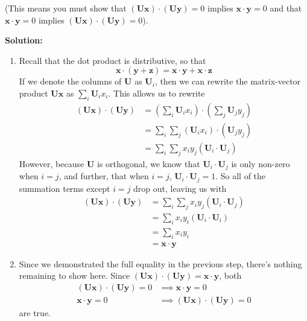 \documentclass[]{article}
\newcommand{\x}{\bm{x}}					%
\newcommand{\y}{\bm{y}}					%
\newcommand{\solution}{\vskip 0.5cm \textbf{\large Solution:} \\}
\begin{document}
\begin{enumerate}
\begin{enumerate}
		(This means you must show that $(\bm{Ux})\cdot(\bm{Uy}) = 0$ implies $\x\cdot \y=0$ and that $\x\cdot \y=0$ implies $(\bm{Ux})\cdot(\bm{Uy}) = 0$).
	  \end{enumerate}

	  \solution
	  \begin{enumerate}
	  \item Recall that the dot product is distributive, so that
        $$\x \cdot (\y + \bm{z}) = \x \cdot \y +
        \x \cdot \bm{z}$$ If we denote the columns of $\bm{U}$ as
        $\bm{U}_i$, then we can rewrite the matrix-vector product
        $\bm{U}\x$ as $\sum_{i} \bm{U}_i x_i$. This allows us to
        rewrite 
        \[\begin{split}
        (\bm{Ux})\cdot(\bm{Uy}) &= \left(\sum_{i} \bm{U}_i x_i\right) \cdot \left(\sum_{j} \bm{U}_j y_j\right) \\
        &= \sum_{i} \sum_{j} (\bm{U}_i x_i) \cdot (\bm{U}_j y_j) \\
        &= \sum_{i} \sum_{j} x_i y_j (\bm{U}_i \cdot \bm{U}_j)
        \end{split}\]
        However, because $\bm{U}$ is orthogonal, we know that
        $\bm{U}_i \cdot \bm{U}_j$ is only non-zero when $i = j$, and
        further, that when $i = j$, $\bm{U}_i \cdot \bm{U}_j = 1$. So
        all of the summation terms except $i = j$ drop out, leaving us
        with
        \[\begin{split}
        (\bm{Ux})\cdot(\bm{Uy}) &= \sum_{i} \sum_{j} x_i y_j (\bm{U}_i \cdot \bm{U}_j) \\
        &= \sum_{i} x_i y_i (\bm{U}_i \cdot \bm{U}_i) \\
        &= \sum_{i}  x_i y_i \\
        &= \x \cdot \y
        \end{split}\]

      \item Since we demonstrated the full equality in the previous
        step, there's nothing remaining to show here. Since
        $(\bm{Ux})\cdot(\bm{Uy}) = \x \cdot \y$, both
        \[\begin{split}
        (\bm{Ux})\cdot(\bm{Uy}) = 0 & \implies \x \cdot \y = 0 \\ 
        \x \cdot \y = 0 & \implies (\bm{Ux})\cdot(\bm{Uy}) = 0
        \end{split}\]
        are true.
	  \end{enumerate}
    \end{enumerate}
\end{document}
